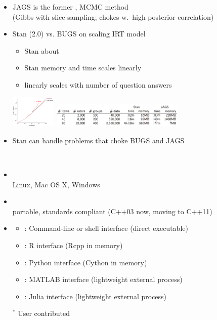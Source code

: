 \documentclass[10pt]{report}
\newcommand{\sld}[1]{\newpage{\noindent\LARGE \ \ \
    \textcolor{MidnightBlue}{\bfseries #1}}\vspace*{4pt}}
\newcommand{\spc}{\hspace*{0.25in}}
\newcommand{\myemph}[1]{{\color{MidnightBlue}{\bfseries #1}}}
\newcommand{\mypart}[2]{{\newpage 
\mbox{ }
\vfill
\noindent\spc\color{MidnightBlue}{\LARGE\bfseries #1\\[10pt]\spc\Huge{#2}}
\vfill\vfill}
\mbox{ }}
\begin{document}
\sld{Stan vs. BUGS / JAGS}
\begin{itemize}
\item JAGS is the former \myemph{state-of-the-art}, \myemph{black-box} MCMC method
\\ {\footnotesize (Gibbs with slice sampling; chokes w.\ high posterior correlation)}
\item Stan (2.0) vs. BUGS on scaling IRT model
\vspace*{-4pt}
\begin{itemize}\footnotesize
\item Stan about \myemph{10 times faster}
\item Stan memory and time scales linearly
\item linearly scales with number of question answers
\end{itemize}
\vspace*{-3pt}
\vfill
\hspace*{-12pt}
\includegraphics[height=0.6in]{img/irt_scale-eps-converted-to.pdf}
\includegraphics[height=0.45in]{img/irt-memory-2.png}
\item Stan can handle problems that choke BUGS and JAGS
\end{itemize}

\mypart{Part I}{Stan Front End}

\sld{Platforms and Interfaces}

\begin{itemize}
\item \myemph{Platforms}
\\
Linux, Mac OS X, Windows
\item \myemph{C++ API}
\\
{\footnotesize portable, standards compliant (C++03 now, moving to C++11)}
\item \myemph{Interfaces}
\vspace*{-4pt}
\begin{itemize}\footnotesize
\item \myemph{CmdStan}: Command-line or shell interface (direct executable)
\item \myemph{RStan}: R interface (Rcpp in memory)
\item \myemph{PyStan}: Python interface (Cython in memory)
\item \myemph{MStan$^*$}: MATLAB interface (lightweight external process)
\item \myemph{JuliaStan$^*$}: Julia interface (lightweight external process)
\end{itemize}
{\footnotesize ${}^*$ User contributed}
\end{itemize}
\vfill
\end{document}
